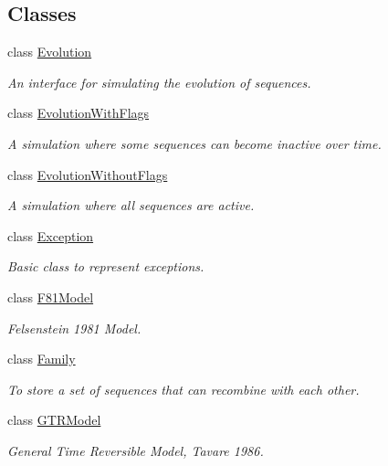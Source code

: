 \subsection*{Classes}
\begin{DoxyCompactItemize}
\item 
class \hyperlink{classretrocombinator_1_1Evolution}{Evolution}
\begin{DoxyCompactList}\small\item\em An interface for simulating the evolution of sequences. \end{DoxyCompactList}\item 
class \hyperlink{classretrocombinator_1_1EvolutionWithFlags}{Evolution\+With\+Flags}
\begin{DoxyCompactList}\small\item\em A simulation where some sequences can become inactive over time. \end{DoxyCompactList}\item 
class \hyperlink{classretrocombinator_1_1EvolutionWithoutFlags}{Evolution\+Without\+Flags}
\begin{DoxyCompactList}\small\item\em A simulation where all sequences are active. \end{DoxyCompactList}\item 
class \hyperlink{classretrocombinator_1_1Exception}{Exception}
\begin{DoxyCompactList}\small\item\em Basic class to represent exceptions. \end{DoxyCompactList}\item 
class \hyperlink{classretrocombinator_1_1F81Model}{F81\+Model}
\begin{DoxyCompactList}\small\item\em Felsenstein 1981 Model. \end{DoxyCompactList}\item 
class \hyperlink{classretrocombinator_1_1Family}{Family}
\begin{DoxyCompactList}\small\item\em To store a set of sequences that can recombine with each other. \end{DoxyCompactList}\item 
class \hyperlink{classretrocombinator_1_1GTRModel}{G\+T\+R\+Model}
\begin{DoxyCompactList}\small\item\em General Time Reversible Model, Tavare 1986. \end{DoxyCompactList}\item 

\end{DoxyCompactItemize}
